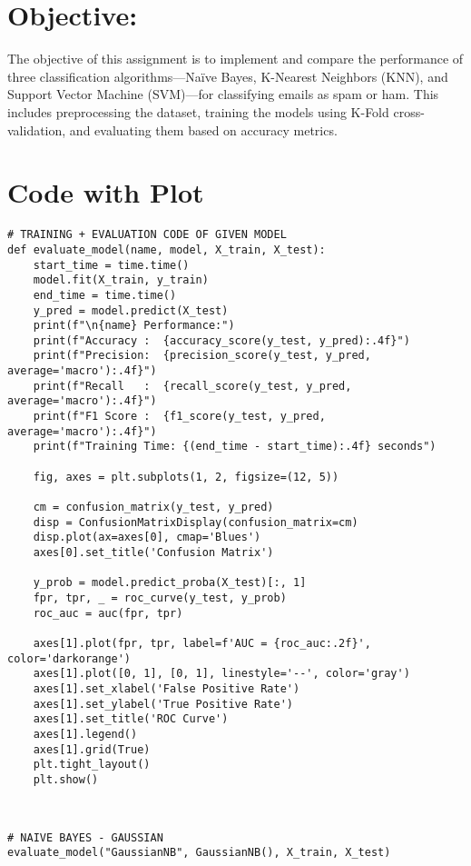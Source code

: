 \documentclass[11pt]{article}
\begin{document}
\noindent
\section{Objective:} 
The objective of this assignment is to implement and compare the performance of three classification algorithms—Naïve Bayes, K-Nearest Neighbors (KNN), and Support Vector Machine (SVM)—for classifying emails as spam or ham. This includes preprocessing the dataset, training the models using K-Fold cross-validation, and evaluating them based on accuracy metrics.

\section{Code with Plot}
\begin{verbatim}
# TRAINING + EVALUATION CODE OF GIVEN MODEL
def evaluate_model(name, model, X_train, X_test):
    start_time = time.time()
    model.fit(X_train, y_train)
    end_time = time.time()
    y_pred = model.predict(X_test)
    print(f"\n{name} Performance:")
    print(f"Accuracy :  {accuracy_score(y_test, y_pred):.4f}")
    print(f"Precision:  {precision_score(y_test, y_pred, average='macro'):.4f}")
    print(f"Recall   :  {recall_score(y_test, y_pred, average='macro'):.4f}")
    print(f"F1 Score :  {f1_score(y_test, y_pred, average='macro'):.4f}")
    print(f"Training Time: {(end_time - start_time):.4f} seconds")

    fig, axes = plt.subplots(1, 2, figsize=(12, 5))

    cm = confusion_matrix(y_test, y_pred)
    disp = ConfusionMatrixDisplay(confusion_matrix=cm)
    disp.plot(ax=axes[0], cmap='Blues')
    axes[0].set_title('Confusion Matrix')

    y_prob = model.predict_proba(X_test)[:, 1]
    fpr, tpr, _ = roc_curve(y_test, y_prob)
    roc_auc = auc(fpr, tpr)

    axes[1].plot(fpr, tpr, label=f'AUC = {roc_auc:.2f}', color='darkorange')
    axes[1].plot([0, 1], [0, 1], linestyle='--', color='gray')
    axes[1].set_xlabel('False Positive Rate')
    axes[1].set_ylabel('True Positive Rate')
    axes[1].set_title('ROC Curve')
    axes[1].legend()
    axes[1].grid(True)
    plt.tight_layout()
    plt.show()

    
\end{verbatim}

\begin{verbatim}
# NAIVE BAYES - GAUSSIAN
evaluate_model("GaussianNB", GaussianNB(), X_train, X_test)
\end{verbatim}
\end{document}
